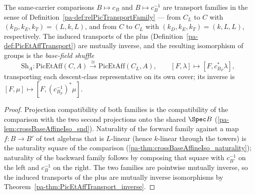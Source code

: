 \begin{definition}
  \label{pa-def:PicEtAff_baseFieldShuffle}
  \leanok

  The same-carrier comparisons \(B \mapsto c_B\) and \(B \mapsto c_B^{-1}\) are transport
  families in the sense of Definition~\ref{pa-def:relPicTransportFamily} — from \(C_L\) to
  \(C\) with \((k_D, k_E, k_T) = (L, k, L)\), and from \(C\) to \(C_L\) with
  \((k_D, k_E, k_T) = (k, L, L)\), respectively. The induced transports of the plus
  (Definition~\ref{pa-def:PicEtAffTransport}) are mutually inverse, and the resulting
  isomorphism of groups is the \emph{base-field shuffle}
  \[
    \mathrm{Sh}_A \colon \mathrm{PicEtAff}(C, A) \xrightarrow{\ \cong\ }
      \mathrm{PicEtAff}(C_L, A),
    \qquad [F, \lambda] \longmapsto [F, c_{B_F}^{*}\lambda],
  \]
  transporting each descent-class representative on its own cover; its inverse is
  \([F, \mu] \mapsto [F, (c_{B_F}^{-1})^{*}\mu]\).
\end{definition}
\begin{proof}
  \leanok
  Projection compatibility of both families is the compatibility of the comparison with
  the two second projections onto the shared \(\Spec B\)
  (\ref{pa-lem:crossBaseAffineIso_snd}). Naturality of the forward family against a map
  \(f \colon B \to B'\) of test algebras that is \(L\)-linear (hence \(k\)-linear through
  the towers) is the naturality square of the comparison
  (\ref{pa-thm:crossBaseAffineIso_naturality}); naturality of the backward family follows by
  composing that square with \(c_{B'}^{-1}\) on the left and \(c_B^{-1}\) on the right.
  The two families are pointwise mutually inverse, so the induced transports of the plus
  are mutually inverse isomorphisms by Theorem~\ref{pa-thm:PicEtAffTransport_inverse}.
\end{proof}

